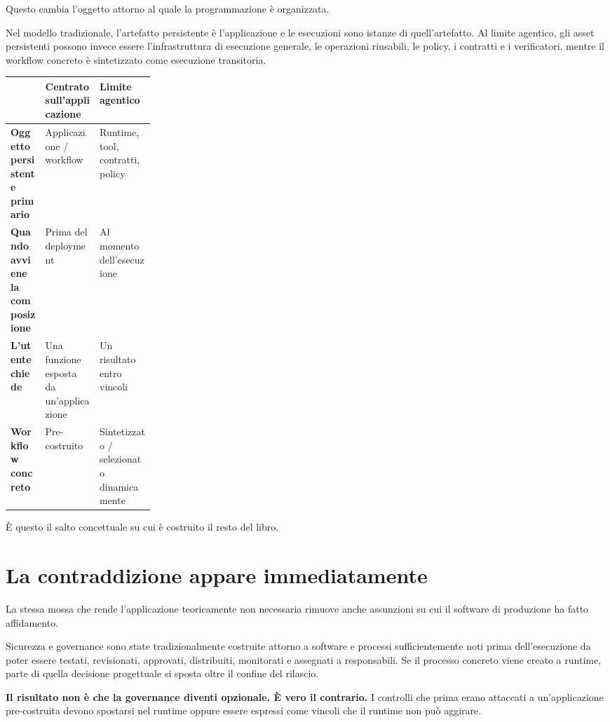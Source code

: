 \documentclass[10pt,oneside,openany]{book}
\begin{document}
Questo cambia l'oggetto attorno al quale la programmazione è organizzata.

Nel modello tradizionale, l'artefatto persistente è l'applicazione e le esecuzioni sono istanze di quell'artefatto. Al limite agentico, gli asset persistenti possono invece essere l'infrastruttura di esecuzione generale, le operazioni riusabili, le policy, i contratti e i verificatori, mentre il workflow concreto è sintetizzato come esecuzione transitoria.

\begin{center}
\begin{tabularx}{0.94\linewidth}{>{\raggedright\arraybackslash\bfseries}p{0.24\linewidth} Y Y}
\toprule
 & Centrato sull'applicazione & Limite agentico \\
\midrule
Oggetto persistente primario & Applicazione / workflow & Runtime, tool, contratti, policy \\
Quando avviene la composizione & Prima del deployment & Al momento dell'esecuzione \\
L'utente chiede & Una funzione esposta da un'applicazione & Un risultato entro vincoli \\
Workflow concreto & Pre-costruito & Sintetizzato / selezionato dinamicamente \\
\bottomrule
\end{tabularx}
\end{center}

È questo il salto concettuale su cui è costruito il resto del libro.

\section{La contraddizione appare immediatamente}

La stessa mossa che rende l'applicazione teoricamente non necessaria rimuove anche assunzioni su cui il software di produzione ha fatto affidamento.

Sicurezza e governance sono state tradizionalmente costruite attorno a software e processi sufficientemente noti prima dell'esecuzione da poter essere testati, revisionati, approvati, distribuiti, monitorati e assegnati a responsabili. Se il processo concreto viene creato a runtime, parte di quella decisione progettuale si sposta oltre il confine del rilascio.

\textbf{Il risultato non è che la governance diventi opzionale. È vero il contrario.} I controlli che prima erano attaccati a un'applicazione pre-costruita devono spostarsi nel runtime oppure essere espressi come vincoli che il runtime non può aggirare.
\end{document}
